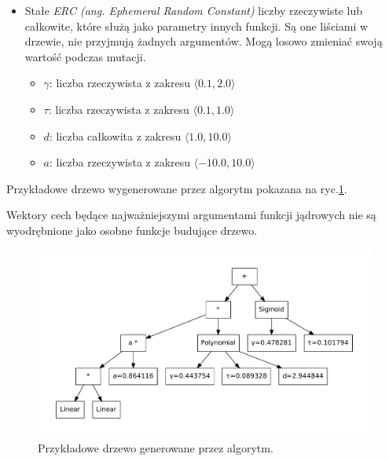 \begin{itemize}
\item Stałe \textit{ERC (ang. Ephemeral Random Constant)} liczby rzeczywiste lub całkowite, które służą jako parametry innych funkcji. Są one liściami w drzewie, nie przyjmują żadnych argumentów. Mogą losowo zmieniać swoją wartość podczas mutacji.
	\begin{itemize}
	\item $ \gamma $: liczba rzeczywista z zakresu $ \langle 0.1, 2.0 \rangle $
	\item $ \tau $: liczba rzeczywista z zakresu $ \langle 0.1, 1.0 \rangle $
	\item $ d $: liczba całkowita z zakresu $ \langle 1.0, 10.0 \rangle $
	\item $ a $: liczba rzeczywista z zakresu $ \langle -10.0, 10.0 \rangle $
	\end{itemize}
\end{itemize}
Przykładowe drzewo wygenerowane przez algorytm pokazana na ryc.\ref{fig:tree}.

Wektory cech będące najważniejszymi argumentami funkcji jądrowych nie są wyodrębnione jako osobne funkcje budujące drzewo.

\begin{figure}[h]
\centering
\includegraphics[scale=0.6]{figures/tree}
\caption{Przykładowe drzewo generowane przez algorytm.\label{fig:tree}}
\end{figure}


